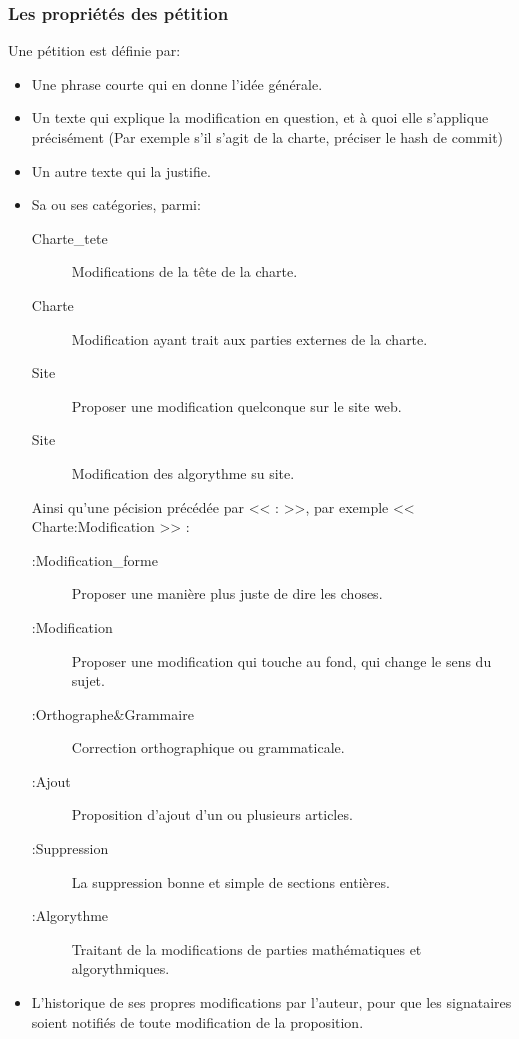 \documentclass[a4paper,12pt]{article}
\begin{document}
\subsubsection{Les propriétés des pétition}
Une pétition est définie par:
\begin{itemize}
 \item Une phrase courte qui en donne l'idée générale.
 \item Un texte qui explique la modification en question, et à quoi elle s'applique précisément (Par exemple s'il s'agit de la charte, préciser le hash de commit)
 \item Un autre texte qui la justifie.
 \item Sa ou ses catégories, parmi:
 \begin{description}
  \item [Charte\_tete] Modifications de la tête de la charte.
  \item [Charte] Modification ayant trait aux parties externes de la charte.
  \item [Site] Proposer une modification quelconque sur le site web.
  \item [Site] Modification des algorythme su site.
 \end{description}
 Ainsi qu'une pécision précédée par << : >>, par exemple << Charte:Modification >> :
 \begin{description}
  \item [:Modification\_forme] Proposer une manière plus juste de dire les choses.
  \item [:Modification] Proposer une modification qui touche au fond, qui change le sens du sujet.
  \item [:Orthographe\&Grammaire] Correction orthographique ou grammaticale.
  \item [:Ajout] Proposition d'ajout d'un ou plusieurs articles.
  \item [:Suppression] La suppression bonne et simple de sections entières.
  \item [:Algorythme] Traitant de la modifications de parties mathématiques et algorythmiques.
 \end{description}
 \item L'historique de ses propres modifications par l'auteur, pour que les signataires soient notifiés de toute modification de la proposition.
\end{itemize}
\end{document}
